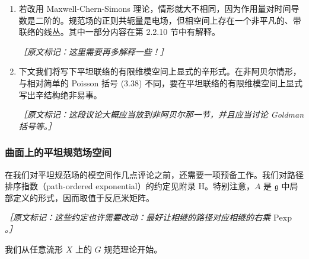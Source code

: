 

\begin{enumerate}[start=2]
  \item 若改用 Maxwell-Chern-Simons 理论，情形就大不相同，因为作用量对时间导数是二阶的。规范场的正则共轭量是电场，但相空间上存在一个非平凡的、带联络的线丛。其中一部分内容在第 2.2.10 节中有解释。

  {\small\itshape ［原文标记：这里需要再多解释一些！］}%

  \item 下文我们将写下平坦联络的有限维模空间上显式的辛形式。在非阿贝尔情形，与相对简单的 Poisson 括号 (3.38) 不同，要在平坦联络的有限维模空间上显式写出辛结构绝非易事。

  {\small\itshape ［原文标记：这段议论大概应当放到非阿贝尔那一节，并且应当讨论 Goldman 括号等。］}%
\end{enumerate}

\subsubsection{曲面上的平坦规范场空间} %

在我们对平坦规范场的模空间作几点评论之前，还需要一项预备工作。我们对路径排序指数（path-ordered exponential）的约定见附录 H。特别注意，$A$ 是 $\mathfrak{g}$ 中局部定义的形式，因而取值于反厄米矩阵。

{\small\itshape ［原文标记：这些约定也许需要改动：最好让相继的路径对应相继的右乘 $\mathrm{Pexp}$。］}%

我们从任意流形 $X$ 上的 $G$ 规范理论开始。

